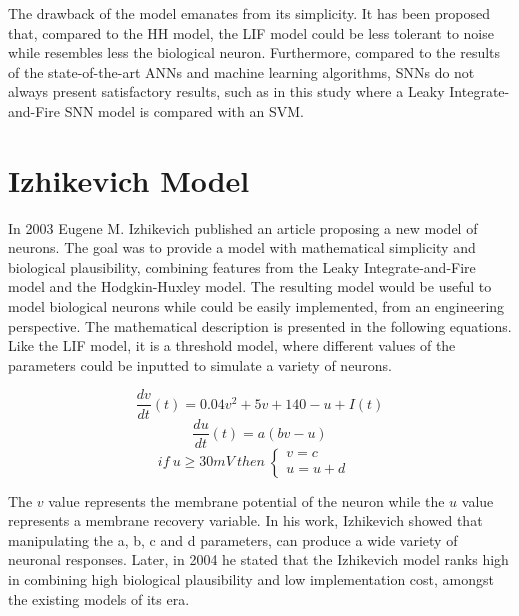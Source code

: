 \documentclass[12pt]{report}
\begin{document}
The drawback of the model emanates from its simplicity. It has been proposed that, compared to the HH model, the LIF model could be less tolerant to noise while resembles less the biological neuron\cite{subthreshold2005}. Furthermore, compared to the results of the state-of-the-art ANNs and machine learning algorithms, SNNs do not always present satisfactory results, such as in this study\cite{SVM2014} where a Leaky Integrate-and-Fire SNN model is compared with an SVM.

\medskip

\section{Izhikevich Model}

In 2003 Eugene M. Izhikevich published an article proposing a new model of neurons\cite{Izhikevich2003}. The goal was to provide a model with mathematical simplicity and biological plausibility, combining features from the Leaky Integrate-and-Fire model and the Hodgkin-Huxley model. The resulting model would be useful to model biological neurons while could be easily implemented, from an engineering perspective. The mathematical description is presented in the following equations. Like the LIF model, it is a threshold model, where different values of the parameters could be inputted to simulate a variety of neurons.

\begin{equation}
    \frac{dv}{dt}(t) = 0.04v^2+5v+140-u+I(t)
\end{equation}
\begin{equation}
\frac{du}{dt}(t) = a(bv-u)
\end{equation}
\begin{equation}
if \:u\geq30mV \: then \: \left\{
\begin{array}{ll}
     v = c &  \\
     u = u+d & 
\end{array}
\right.
\end{equation}

The \(v\) value represents the membrane potential of the neuron while the \(u\) value represents a membrane recovery variable. In his work, Izhikevich showed that manipulating the a, b, c and d parameters, can produce a wide variety of neuronal responses. Later, in 2004 he stated\cite{Izhikevich2004} that the Izhikevich model ranks high in combining high biological plausibility and low implementation cost, amongst the existing models of its era. 
\end{document}
